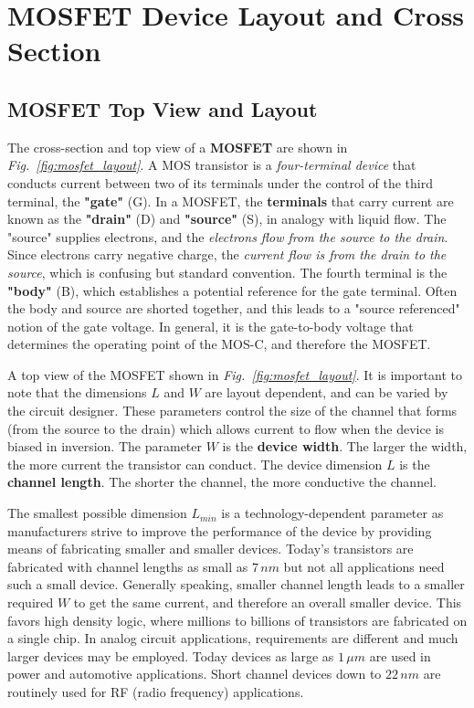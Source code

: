 \section{MOSFET Device Layout and Cross Section}
\subsection{MOSFET Top View and Layout}
The cross-section and top view of a \textbf{MOSFET} are shown in \emph{Fig.~\ref{fig:mosfet_layout}}.  A MOS transistor is a \textit{four-terminal device} that conducts current between two of its terminals under the control of the third terminal, the \textbf{"gate"} (G).  In a MOSFET, the \textbf{terminals} that carry current are known as the \textbf{"drain"} (D) and \textbf{"source"} (S), in analogy with liquid flow.  The "source" supplies electrons, and the \textit{electrons flow from the source to the drain}.  Since electrons carry negative charge, the \textit{current flow is from the drain to the source}, which is confusing but standard convention.  The fourth terminal is the \textbf{"body"} (B), which establishes a potential reference for the gate terminal.  Often the body and source are shorted together, and this leads to a "source referenced" notion of the gate voltage.  In general, it is the gate-to-body voltage that determines the operating point of the MOS-C, and therefore the MOSFET.

A top view of the MOSFET shown in \emph{Fig.~\ref{fig:mosfet_layout}}.  It is important to note that the dimensions $L$ and $W$ are layout dependent, and can be varied by the circuit designer.  These parameters control the size of the channel that forms (from the source to the drain) which allows current to flow when the device is biased in inversion.  The parameter $W$ is the \textbf{device width}.  The larger the width, the more current the transistor can conduct.  The device dimension $L$ is the \textbf{channel length}. The shorter the channel, the more conductive the channel.

The smallest possible dimension $L_{min}$ is a technology-dependent parameter as manufacturers strive to improve the performance of the device by providing means of fabricating smaller and smaller devices.  Today's transistors are fabricated with channel lengths as small as $7\,nm$ but not all applications need such a small device.  Generally speaking, smaller channel length leads to a smaller required $W$ to get the same current, and therefore an overall smaller device.  This favors high density logic, where millions to billions of transistors are fabricated on a single chip.  In analog circuit applications, requirements are different and much larger devices may be employed.  Today devices as large as $1\,\mu m$ are used in power and automotive applications.  Short channel devices down to $22\,nm$ are routinely used for RF (radio frequency) applications.

